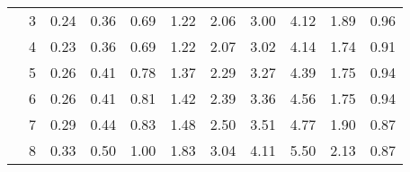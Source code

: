 \begin{tabular}{llrrrrrrrrr}
       & 3 & 0.24 & 0.36 & 0.69 & 1.22 & 2.06 & 3.00 & 4.12 & 1.89 & 0.96 \\
       & 4 & 0.23 & 0.36 & 0.69 & 1.22 & 2.07 & 3.02 & 4.14 & 1.74 & 0.91 \\
       & 5 & 0.26 & 0.41 & 0.78 & 1.37 & 2.29 & 3.27 & 4.39 & 1.75 & 0.94 \\
       & 6 & 0.26 & 0.41 & 0.81 & 1.42 & 2.39 & 3.36 & 4.56 & 1.75 & 0.94 \\
       & 7 & 0.29 & 0.44 & 0.83 & 1.48 & 2.50 & 3.51 & 4.77 & 1.90 & 0.87 \\
       & 8 & 0.33 & 0.50 & 1.00 & 1.83 & 3.04 & 4.11 & 5.50 & 2.13 & 0.87 \\
\bottomrule
\end{tabular}

